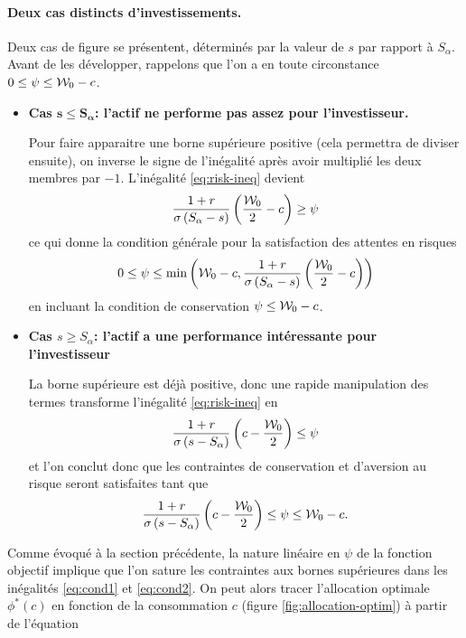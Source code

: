 \documentclass{article}
\numberwithin{equation}{section}
\begin{document}
\paragraph{Deux cas distincts d'investissements.} Deux cas de figure se présentent, déterminés par la valeur de $s$ par rapport à $S_\alpha$. Avant de les développer, rappelons que l'on a en toute circonstance $0\leq \psi\leq \mathcal{W}_0 - c$.
\begin{itemize}
\item\textbf{Cas $\boldsymbol{s\leq S_\alpha}$: l'actif ne performe pas assez pour l'investisseur.}

Pour faire apparaitre une borne supérieure positive (cela permettra de diviser ensuite), on inverse le signe de l'inégalité après avoir multiplié les deux membres par $-1$. L'inégalité \eqref{eq:risk-ineq} devient 
$$
\frac{1+r}{\sigma\left(S_\alpha - s\right)}\left( \frac{\mathcal{W}_0}{2} - c \right) \geq \psi
$$
ce qui donne la condition générale pour la satisfaction des attentes en risques
\begin{equation}\label{eq:cond1}
0\leq\psi\leq \min\left( \mathcal{W}_0 - c, \frac{1+r}{\sigma\left(S_\alpha - s\right)}\left( \frac{\mathcal{W}_0}{2} - c \right) \right)
\end{equation}
en incluant la condition de conservation $\psi\leq\mathcal{W}_0-c$.

\item\textbf{Cas $s\geq S_\alpha$: l'actif a une performance intéressante pour l'investisseur} 

La borne supérieure est déjà positive, donc une rapide manipulation des termes transforme l'inégalité \eqref{eq:risk-ineq} en
$$
\frac{1+r}{\sigma\left(s - S_\alpha\right)}\left( c  - \frac{\mathcal{W}_0}{2}\right) \leq \psi
$$
et l'on conclut donc que les contraintes de conservation et d'aversion au risque seront satisfaites tant que
\begin{equation}\label{eq:cond2}
\frac{1+r}{\sigma\left(s - S_\alpha\right)}\left( c  - \frac{\mathcal{W}_0}{2}\right) \leq \psi\leq \mathcal{W}_0 - c.
\end{equation}
\end{itemize}

Comme évoqué à la section précédente, la nature linéaire en $\psi$ de la fonction objectif implique que l'on sature les contraintes aux bornes supérieures dans les inégalités \eqref{eq:cond1} et \eqref{eq:cond2}. On peut alors tracer l'allocation optimale $\phi^*(c)$ en fonction de la consommation $c$ (figure \ref{fig:allocation-optim}) à partir de l'équation
\end{document}
